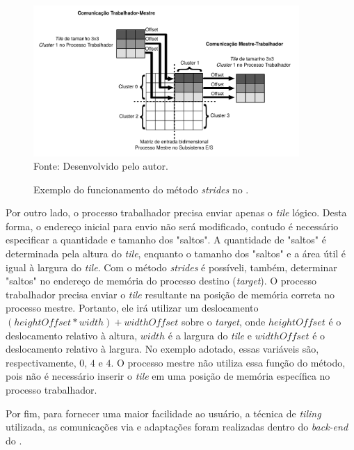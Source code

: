 \begin{figure}[!h]
	\centering
    \caption{Exemplo do funcionamento do método \textit{strides} no \mppa.}
	\includegraphics[width=0.9\textwidth]{figs/stridesImage.pdf} \\
    Fonte: Desenvolvido pelo autor.
	\label{fig:strides}
\end{figure}

Por outro lado, o processo trabalhador precisa enviar apenas o \textit{tile}
lógico. Desta forma, o endereço inicial para envio não será modificado, contudo
é necessário especificar a quantidade e tamanho dos "saltos"{}. A quantidade de
"saltos"{} é determinada pela altura do \textit{tile}, enquanto o tamanho dos
"saltos"{} e a área útil é igual à largura do \textit{tile}. Com o método
\textit{strides} é possíveli, também, determinar "saltos"{} no endereço de
memória do processo destino (\textit{target}). O processo trabalhador precisa
enviar o \textit{tile} resultante na posição de memória correta no processo
mestre.  Portanto, ele irá utilizar um deslocamento $(heightOffset * width) +
widthOffset$ sobre o \textit{target}, onde $heightOffset$ é o deslocamento
relativo à altura, $width$ é a largura do \textit{tile} e $widthOffset$ é o
deslocamento relativo à largura. No exemplo adotado, essas variáveis são,
respectivamente, $0$, $4$ e $4$. O processo mestre não utiliza essa função do
método, pois não é necessário inserir o \textit{tile} em uma posição de memória
específica no processo trabalhador.

Por fim, para fornecer uma maior facilidade ao usuário, a técnica de
\textit{tiling} utilizada, as comunicações via \noc e adaptações foram
realizadas dentro do \textit{back-end} do \pskel.
